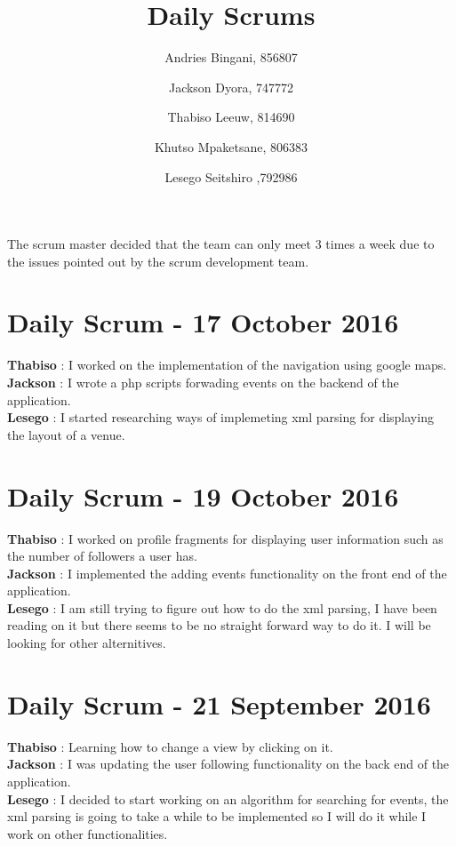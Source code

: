 \documentclass[10pt,a4paper]{article}
\title{Daily Scrums}
\author{
  Andries Bingani, 856807 \and
  Jackson Dyora, 747772\and
  Thabiso Leeuw, 814690 \and
  Khutso Mpaketsane, 806383 \and
  Lesego Seitshiro ,792986
}
\begin{document}
\maketitle

The scrum master decided that the team can only meet 3 times a week due to the issues pointed out by the scrum development team.

\section{Daily Scrum - 17 October 2016}
\textbf{Thabiso} : I worked on the implementation of the navigation using google maps.\\

\textbf{Jackson} : I wrote a php scripts forwading events on the backend of the application.\\

\textbf{Lesego} : I started researching ways of implemeting xml parsing for displaying the layout of a venue.\\
\section{Daily Scrum - 19 October 2016}
\textbf{Thabiso} : I worked on profile fragments for displaying user information such as the number of followers a user has.\\

\textbf{Jackson} : I implemented the adding events functionality on the front end of the application.\\

\textbf{Lesego} : I am still trying to figure out how to do the xml parsing, I have been reading on it but there seems to be no straight forward way to do it. I will be looking for other alternitives.\\

\section{Daily Scrum - 21 September 2016}
\textbf{Thabiso} : Learning how to change a view by clicking on it.\\

\textbf{Jackson} : I was updating the user following functionality on the back end of the application.\\

\textbf{Lesego} : I decided to start working on an algorithm for searching for events, the xml parsing is going to take a while to be implemented so I will do it while I work on other functionalities.\\
\end{document}
